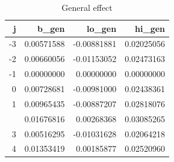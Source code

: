 \begin{table}

\caption{General effect}
\centering
\begin{tabular}[t]{rrrr}
\toprule
j & b\_gen & lo\_gen & hi\_gen\\
\midrule
-3 & 0.00571588 & -0.00881881 & 0.02025056\\
-2 & 0.00660056 & -0.01153052 & 0.02473163\\
-1 & 0.00000000 & 0.00000000 & 0.00000000\\
0 & 0.00728681 & -0.00981000 & 0.02438361\\
1 & 0.00965435 & -0.00887207 & 0.02818076\\
\addlinespace
2 & 0.01676816 & 0.00268368 & 0.03085265\\
3 & 0.00516295 & -0.01031628 & 0.02064218\\
4 & 0.01353419 & 0.00185877 & 0.02520960\\
\bottomrule
\end{tabular}
\end{table}
